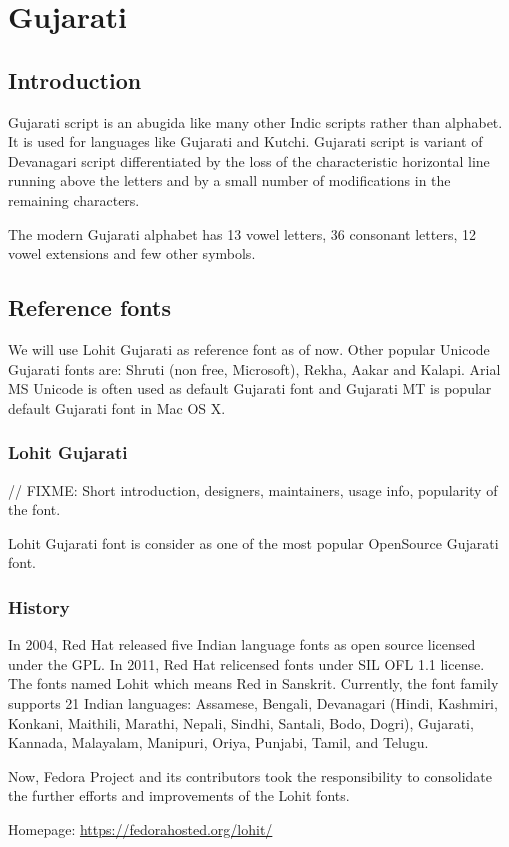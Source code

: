 \chapter{Gujarati}
\section{Introduction}

Gujarati script is an abugida like many other Indic scripts rather than
alphabet. It is used for languages like Gujarati and Kutchi. Gujarati script is
variant of Devanagari script differentiated by the loss of the characteristic
horizontal line running above the letters and by a small number of
modifications in the remaining characters.

The modern Gujarati alphabet has 13 vowel letters, 36 consonant letters, 12
vowel extensions and few other symbols.

\section{Reference fonts}

We will use Lohit Gujarati as reference font as of now. Other popular Unicode
Gujarati fonts are: Shruti (non free, Microsoft), Rekha, Aakar and Kalapi. Arial
MS Unicode is often used as default Gujarati font and Gujarati MT is popular
default Gujarati font in Mac OS X.

\subsection{Lohit Gujarati}
// FIXME: Short introduction, designers, maintainers, usage info, popularity of
the font.

Lohit Gujarati font is consider as one of the most popular OpenSource Gujarati
font.

\subsection{History}
In 2004, Red Hat released five Indian language fonts as open source licensed
under the GPL. In 2011, Red Hat relicensed fonts under SIL OFL 1.1 license.
The fonts named Lohit which means Red in Sanskrit. Currently, the font family
supports 21 Indian languages: Assamese, Bengali, Devanagari (Hindi, Kashmiri,
Konkani, Maithili, Marathi, Nepali, Sindhi, Santali, Bodo, Dogri), Gujarati,
Kannada, Malayalam, Manipuri, Oriya, Punjabi, Tamil, and Telugu.

Now, Fedora Project and its contributors took the responsibility to consolidate
the further efforts and improvements of the Lohit fonts.

Homepage: {\url{https://fedorahosted.org/lohit/}}

